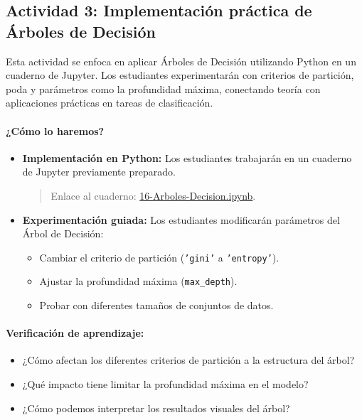 \documentclass[a4,11pt]{aleph-notas}
\begin{document}
\subsection*{Actividad 3: Implementación práctica de Árboles de Decisión}

Esta actividad se enfoca en aplicar Árboles de Decisión utilizando Python en un cuaderno de Jupyter. Los estudiantes experimentarán con criterios de partición, poda y parámetros como la profundidad máxima, conectando teoría con aplicaciones prácticas en tareas de clasificación.

\paragraph{¿Cómo lo haremos?}  
\begin{itemize}[leftmargin=*]  
    \item \textbf{Implementación en Python:} Los estudiantes trabajarán en un cuaderno de Jupyter previamente preparado.  
    \begin{quote}  
        Enlace al cuaderno: \href{https://colab.research.google.com/github/andres-merino/AprendizajeAutomaticoInicial-05-N0105/blob/main/2-Notebooks/16-Arboles-Decision.ipynb}{16-Arboles-Decision.ipynb}.  
    \end{quote}  
    \item \textbf{Experimentación guiada:} Los estudiantes modificarán parámetros del Árbol de Decisión:  
        \begin{itemize}[leftmargin=*]  
            \item Cambiar el criterio de partición (\texttt{'gini'} a \texttt{'entropy'}).  
            \item Ajustar la profundidad máxima (\texttt{max\_depth}).  
            \item Probar con diferentes tamaños de conjuntos de datos.  
        \end{itemize}  
\end{itemize}  

\paragraph{Verificación de aprendizaje:}  
\begin{itemize}[leftmargin=*]  
    \item ¿Cómo afectan los diferentes criterios de partición a la estructura del árbol?  
    \item ¿Qué impacto tiene limitar la profundidad máxima en el modelo?  
    \item ¿Cómo podemos interpretar los resultados visuales del árbol?  
\end{itemize}  
\end{document}
